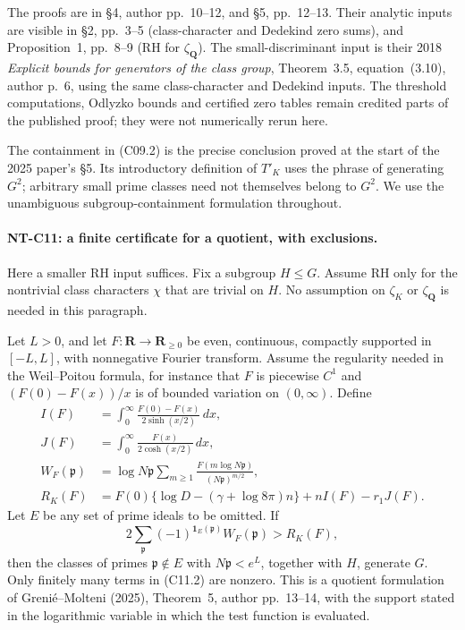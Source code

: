 The proofs are in \S4, author pp.~10--12, and \S5,
pp.~12--13. Their analytic inputs are visible in \S2,
pp.~3--5 (class-character and Dedekind zero sums), and
Proposition~1, pp.~8--9 (RH for \(\zeta_{\mathbf Q}\)).
The small-discriminant input is their 2018
\emph{Explicit bounds for generators of the class group},
Theorem~3.5, equation~(3.10), author p.~6, using the
same class-character and Dedekind inputs.
The threshold computations, Odlyzko bounds and certified zero
tables remain credited parts of the published proof; they were
not numerically rerun here.

The containment in (C09.2) is the precise conclusion proved
at the start of the 2025 paper's \S5. Its introductory definition
of \(T'_K\) uses the phrase of generating \(G^2\); arbitrary
small prime classes need not themselves belong to \(G^2\).
We use the unambiguous subgroup-containment formulation throughout.

\paragraph{NT-C11: a finite certificate for a quotient, with exclusions.}
Here a smaller RH input suffices. Fix a subgroup \(H\le G\).
Assume RH only for the nontrivial class characters \(\chi\)
that are trivial on \(H\). No assumption on \(\zeta_K\) or
\(\zeta_{\mathbf Q}\) is needed in this paragraph.

Let \(L>0\), and let \(F:\mathbf R\to\mathbf R_{\ge0}\) be even, continuous,
compactly supported in \([-L,L]\), with nonnegative Fourier
transform. Assume the regularity needed in the Weil--Poitou
formula, for instance that \(F\) is piecewise \(C^1\) and
\((F(0)-F(x))/x\) is of bounded variation on \((0,\infty)\).
Define
\[
 \begin{split}
 I(F)&=\int_0^\infty
                  \frac{F(0)-F(x)}{2\sinh(x/2)}\,dx,\\
 J(F)&=\int_0^\infty\frac{F(x)}{2\cosh(x/2)}\,dx,\\
 W_F(\mathfrak p)&=\log N\mathfrak p
       \sum_{m\ge1}\frac{F(m\log N\mathfrak p)}
                              {(N\mathfrak p)^{m/2}},\\
 R_K(F)&=F(0)\{\log D-(\gamma+\log8\pi)n\}
                                      +nI(F)-r_1J(F).
 \end{split}                                                    \tag{C11.1}
\]
Let \(E\) be any set of prime ideals to be omitted. If
\[
       2\sum_{\mathfrak p}
             (-1)^{\mathbf1_E(\mathfrak p)}W_F(\mathfrak p)
                          >R_K(F),                            \tag{C11.2}
\]
then the classes of primes \(\mathfrak p\notin E\) with
\(N\mathfrak p<e^L\), together with \(H\), generate \(G\).
Only finitely many terms in (C11.2) are nonzero. This is a
quotient formulation of Greni\'e--Molteni (2025),
Theorem~5, author pp.~13--14, with the support stated in
the logarithmic variable in which the test function is evaluated.

